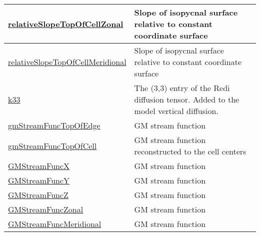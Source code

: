 {\begin{center}
\begin{longtable}{| p{2.0in} | p{4.0in} |}
	\hyperref[subsec:var_sec_diagnostics_relativeSlopeTopOfCellZonal]{relativeSlopeTopOfCellZonal} & Slope of isopycnal surface relative to constant coordinate surface \\
	\hline
	\hyperref[subsec:var_sec_diagnostics_relativeSlopeTopOfCellMeridional]{relativeSlopeTopOfCellMeridional} & Slope of isopycnal surface relative to constant coordinate surface \\
	\hline
	\hyperref[subsec:var_sec_diagnostics_k33]{k33} & The (3,3) entry of the Redi diffusion tensor. Added to the model vertical diffusion. \\
	\hline
	\hyperref[subsec:var_sec_diagnostics_gmStreamFuncTopOfEdge]{gmStreamFuncTopOfEdge} & GM stream function \\
	\hline
	\hyperref[subsec:var_sec_diagnostics_gmStreamFuncTopOfCell]{gmStreamFuncTopOfCell} & GM stream function reconstructed to the cell centers \\
	\hline
	\hyperref[subsec:var_sec_diagnostics_GMStreamFuncX]{GMStreamFuncX} & GM stream function \\
	\hline
	\hyperref[subsec:var_sec_diagnostics_GMStreamFuncY]{GMStreamFuncY} & GM stream function \\
	\hline
	\hyperref[subsec:var_sec_diagnostics_GMStreamFuncZ]{GMStreamFuncZ} & GM stream function \\
	\hline
	\hyperref[subsec:var_sec_diagnostics_GMStreamFuncZonal]{GMStreamFuncZonal} & GM stream function \\
	\hline
	\hyperref[subsec:var_sec_diagnostics_GMStreamFuncMeridional]{GMStreamFuncMeridional} & GM stream function \\
	\hline
\end{longtable}
\end{center}
}
